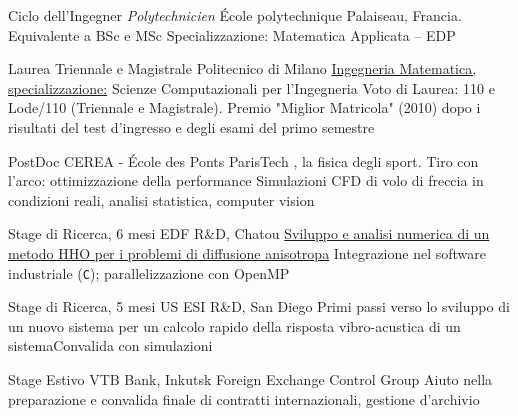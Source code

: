 \documentclass[italian]{RMcv}
\begin{document}
{%

%
%
        {Ciclo dell'Ingegner \textit{Polytechnicien}}%
        {École polytechnique}%
        {Palaiseau, Francia. Equivalente a BSc e MSc}%
        {Specializzazione: Matematica Applicata -- EDP}


%
%
        {Laurea Triennale e Magistrale}%
        {Politecnico di Milano}%
        {\href{\tesilink}{Ingegneria Matematica, specializzazione:} Scienze Computazionali per l'Ingegneria}%
        {Voto di Laurea: 110 e Lode/110 (Triennale e Magistrale). Premio "Miglior Matricola" (2010) dopo i risultati del test d'ingresso e degli esami del primo semestre}

\vspace{8pt}


%
        {PostDoc}%
        {CEREA - \'Ecole des Ponts ParisTech}%
        {\SciencesJOhref{}, la fisica degli sport. Tiro con l'arco: ottimizzazione della performance}%
        {Simulazioni CFD di volo di freccia in condizioni reali, analisi statistica, computer vision}

%
%
        {Stage di Ricerca, 6 mesi}%
        {EDF R\&D, Chatou}%
        {\href{\tesilink}{Sviluppo e analisi numerica di un metodo HHO per i problemi di diffusione anisotropa}}%
        {Integrazione nel software industriale \cs{} (\texttt{C}); parallelizzazione con OpenMP}


%
%
        {Stage di Ricerca, 5 mesi}%
        {US ESI R\&D, San Diego}%
        {Primi passi verso lo sviluppo di un nuovo sistema per un calcolo rapido della risposta vibro-acustica di un sistema}{Convalida con simulazioni}


%
%
        {Stage Estivo}%
        {VTB Bank, Inkutsk}%
        {Foreign Exchange Control Group}%
        {Aiuto nella preparazione e convalida finale di contratti internazionali, gestione d'archivio}

}
\end{document}
